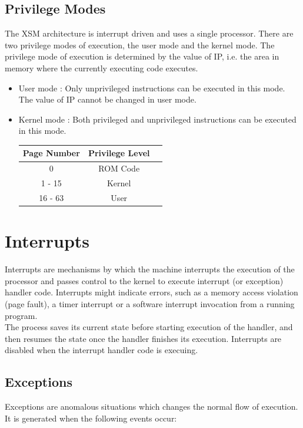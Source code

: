 \documentclass[11pt]{report}
\begin{document}
\section{Privilege Modes}
\label{sec:priv_modes}
The XSM architecture is interrupt driven and uses a single processor. There are two privilege modes of execution, the user mode and the kernel mode. The privilege mode of execution is determined by the value of IP, i.e. the area in memory where the currently executing code executes. 


\begin{itemize}
\item User mode : Only unprivileged instructions can be executed in this mode. The value of IP cannot be changed in user mode.

\item Kernel mode : Both privileged and unprivileged instructions can be executed in this mode. 

\begin{center}
\begin{tabular}{|c|c|c|}
\hline \textbf{Page Number} & \textbf{Privilege Level} \\ 
\hline 0 & ROM Code \\ 
\hline 1 - 15 & Kernel \\ 
\hline 16 - 63 & User  \\ 

\hline
\end{tabular} 
\end{center}

\end{itemize}

\chapter{Interrupts}
\label{sec:int}

Interrupts are mechanisms by which the machine interrupts the execution of the processor and passes control to the kernel to execute interrupt (or exception) handler code. Interrupts might indicate errors, such as a memory access violation (page fault), a timer interrupt or a software interrupt invocation from a running program. \\

The process saves its current state before starting execution of the handler, and then resumes the state once the handler finishes its execution. Interrupts are disabled when the interrupt handler code is execuing. 


\section{Exceptions}
\label{excpetion}
Exceptions are anomalous situations which changes the normal flow of execution. It is generated when the following events occur:
\end{document}
